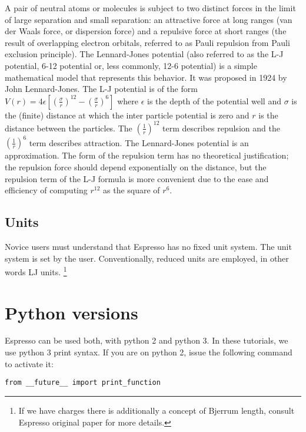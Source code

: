 \documentclass[
paper=a4,                       %
fontsize=11pt,                  %
twoside,                        %
footsepline,                    %
headsepline,                    %
headinclude=false,              %
footinclude=false,              %
pagesize,                       %
]{scrartcl}
\begin{document}
A pair of neutral atoms or molecules is subject to two distinct forces in the limit
of large separation and small separation: an attractive force at long ranges (van der
Waals force, or dispersion force) and a repulsive force at short ranges (the result
of overlapping electron orbitals, referred to as Pauli repulsion from Pauli exclusion
principle). The Lennard-Jones potential (also referred to as the L-J potential, 6-12
potential or, less commonly, 12-6 potential) is a simple mathematical model that
represents this behavior. It was proposed in 1924 by John Lennard-Jones. The L-J
potential is of the form
\begin{math}
\label{eq:lj}
    V(r) = 4\epsilon [{({\frac{\sigma}{r}})}^{12} - (\frac{\sigma}{r})^{6}]
\end{math}
where $\epsilon$ is the depth of the potential well and $\sigma$ is the (finite)
distance at which the inter particle potential is zero and $r$ is the distance between
the particles. The $(\frac{1}{r})^{12}$ term describes repulsion and the
$(\frac{1}{r})^{6}$  term describes attraction. The Lennard-Jones potential is an
approximation. The form of the repulsion term has no theoretical justification; the
repulsion force should depend exponentially on the distance, but the repulsion term
of the L-J formula is more convenient due to the ease and efficiency of computing
$r^{12}$ as the square of $r^6$.

\subsection{Units}

Novice users must understand that Espresso has no fixed unit system. The unit 
system is set by the user. Conventionally, reduced units are employed, in other 
words LJ units.
\footnote{If we have charges there is additionally a concept of Bjerrum length, consult Espresso original paper for more details.} 


\section{Python versions}

Espresso can be used both, with python 2 and python 3. In these tutorials, we use python 3 print syntax. If you are on python 2, issue the following command to activate it:
\begin{lstlisting}
from __future__ import print_function
\end{lstlisting}
\end{document}
